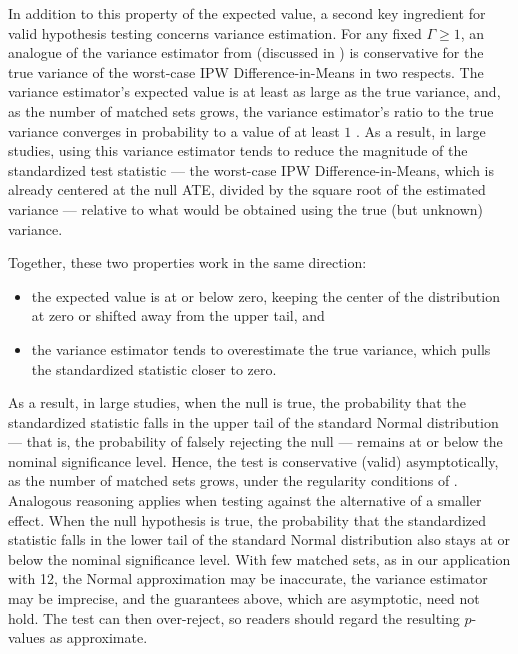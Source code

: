 \documentclass[
  12pt,
  leqno]{article}
\providecommand{\tightlist}{%
  \setlength{\itemsep}{0pt}\setlength{\parskip}{0pt}}
\def\tightlist{}
\begin{document}
In addition to this property of the expected value, a second key
ingredient for valid hypothesis testing concerns variance estimation.
For any fixed \(\Gamma \geq 1\), an analogue of the variance estimator
from \citet{fogarty2018} (discussed in
) is
conservative for the true variance of the worst-case IPW
Difference-in-Means in two respects. The variance estimator's expected
value is at least as large as the true variance, and, as the number of
matched sets grows, the variance estimator's ratio to the true variance
converges in probability to a value of at least \(1\) \citep[Lemma 2 and
p.~2202]{fogarty2023}. As a result, in large studies, using this
variance estimator tends to reduce the magnitude of the standardized
test statistic --- the worst-case IPW Difference-in-Means, which is
already centered at the null ATE, divided by the square root of the
estimated variance --- relative to what would be obtained using the true
(but unknown) variance.

Together, these two properties work in the same direction:

\begin{itemize}
\tightlist
\item
  the expected value is at or below zero, keeping the center of the
  distribution at zero or shifted away from the upper tail, and
\item
  the variance estimator tends to overestimate the true variance, which
  pulls the standardized statistic closer to zero.
\end{itemize}

As a result, in large studies, when the null is true, the probability
that the standardized statistic falls in the upper tail of the standard
Normal distribution --- that is, the probability of falsely rejecting
the null --- remains at or below the nominal significance level. Hence,
the test is conservative (valid) asymptotically, as the number of
matched sets grows, under the regularity conditions of \citet[Theorem
2]{fogarty2023}. Analogous reasoning applies when testing against the
alternative of a smaller effect. When the null hypothesis is true, the
probability that the standardized statistic falls in the lower tail of
the standard Normal distribution also stays at or below the nominal
significance level. With few matched sets, as in our application with
12, the Normal approximation may be inaccurate, the variance estimator
may be imprecise, and the guarantees above, which are asymptotic, need
not hold. The test can then over-reject, so readers should regard the
resulting \(p\)-values as approximate.
\end{document}
